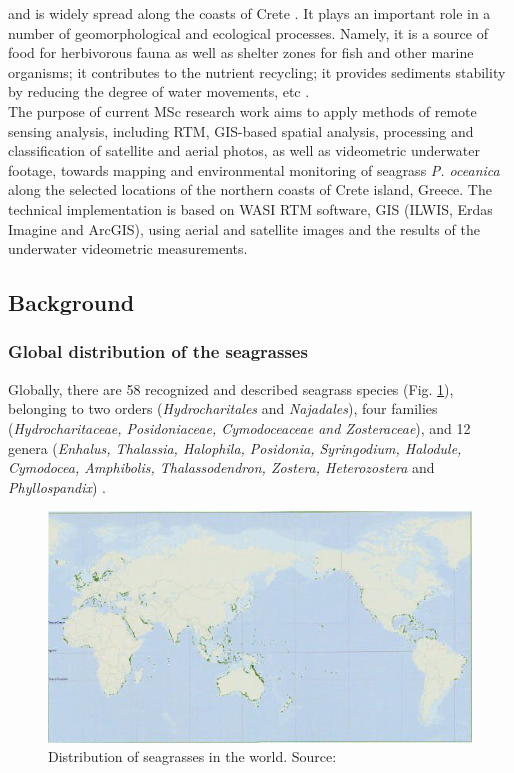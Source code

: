 \documentclass[11pt]{article}
\begin{document}
and is widely spread along the coasts of Crete \cite{Dumay02} \label{Dumay02}. 
It plays an important role in a number
of geomorphological and ecological processes. Namely, it is a source of food for herbivorous fauna as
well as shelter zones for fish and other marine organisms; it contributes to the nutrient recycling; it
provides sediments stability by reducing the degree of water movements, etc \cite{Francour99}\label{Francour99}.\\
The purpose of current MSc research work aims to apply methods of remote sensing analysis, including \ac{RTM}, 
\ac{GIS}-based spatial analysis, processing and classification of satellite and aerial photos, as well as videometric underwater footage, towards mapping and environmental monitoring of seagrass \textit{P. oceanica} along the selected locations of the northern coasts of Crete island, Greece. The technical implementation is based on \ac{WASI} RTM software, \ac{GIS} (ILWIS, Erdas Imagine and ArcGIS), using aerial and satellite images and the results of the underwater videometric measurements. 

\subsection{Background}
\subsubsection{Global distribution of the seagrasses}
Globally, there are 58 recognized and described seagrass species (Fig. \ref{fig:2}), belonging to two orders
(\textit{Hydrocharitales} and \textit{Najadales}), four families (\textit{Hydrocharitaceae, Posidoniaceae, Cymodoceaceae
and Zosteraceae}), and 12 genera (\textit{Enhalus, Thalassia, Halophila, Posidonia, Syringodium, Halodule,
Cymodocea, Amphibolis, Thalassodendron, Zostera, Heterozostera} and \textit{Phyllospandix}) \cite{Kuo89}\label{Kuo89}.

\begin{figure}
	\centering
	\includegraphics[scale=0.40]{Fig-1-2.jpg}
	\caption{Distribution of seagrasses in the world. Source:\cite{Green03}\label{Green03} 
	\label{fig:2}} 
\end{figure}
\end{document}
